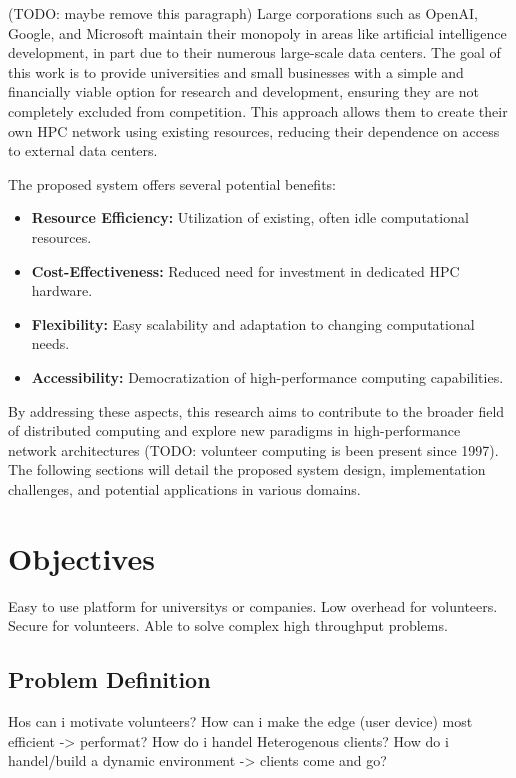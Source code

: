 (TODO: maybe remove this paragraph) Large corporations such as OpenAI, Google, and Microsoft maintain their monopoly in areas like artificial intelligence development, in part due to their numerous large-scale data centers. The goal of this work is to provide universities and small businesses with a simple and financially viable option for research and development, ensuring they are not completely excluded from competition. This approach allows them to create their own \ac{HPC} network using existing resources, reducing their dependence on access to external data centers.

The proposed system offers several potential benefits:

\begin{itemize}
    \item \textbf{Resource Efficiency:} Utilization of existing, often idle computational resources.
    \item \textbf{Cost-Effectiveness:} Reduced need for investment in dedicated HPC hardware.
    \item \textbf{Flexibility:} Easy scalability and adaptation to changing computational needs.
    \item \textbf{Accessibility:} Democratization of high-performance computing capabilities.
\end{itemize}

By addressing these aspects, this research aims to contribute to the broader field of distributed computing and explore new paradigms in high-performance network architectures (TODO: volunteer computing is been present since 1997). The following sections will detail the proposed system design, implementation challenges, and potential applications in various domains.

\section{Objectives}
\label{sec:intro:objectives}
Easy to use platform for universitys or companies. Low overhead for volunteers. Secure for volunteers. Able to solve complex high throughput problems.

\subsection{Problem Definition}
\label{subsec:into:objectives:problems}
Hos can i motivate volunteers? How can i make the edge (user device) most efficient -> performat? How do i handel Heterogenous clients? How do i handel/build a dynamic environment -> clients come and go?

